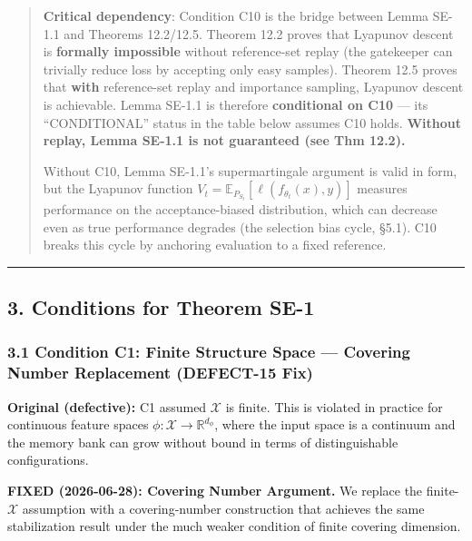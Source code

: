\documentclass[
  12pt,
]{article}
\begin{document}
\begin{quote}
\textbf{Critical dependency}: Condition C10 is the bridge between Lemma
SE-1.1 and Theorems 12.2/12.5. Theorem 12.2 proves that Lyapunov descent
is \textbf{formally impossible} without reference-set replay (the
gatekeeper can trivially reduce loss by accepting only easy samples).
Theorem 12.5 proves that \textbf{with} reference-set replay and
importance sampling, Lyapunov descent is achievable. Lemma SE-1.1 is
therefore \textbf{conditional on C10} --- its ``CONDITIONAL'' status in
the table below assumes C10 holds. \textbf{Without replay, Lemma SE-1.1
is not guaranteed (see Thm 12.2).}

Without C10, Lemma SE-1.1's supermartingale argument is valid in form,
but the Lyapunov function
\(V_t = \mathbb{E}_{P_{S_t}}[\ell(f_{\theta_t}(x), y)]\) measures
performance on the acceptance-biased distribution, which can decrease
even as true performance degrades (the selection bias cycle, §5.1). C10
breaks this cycle by anchoring evaluation to a fixed reference.
\end{quote}

\begin{center}\rule{0.5\linewidth}{0.5pt}\end{center}

\subsection{3. Conditions for Theorem
SE-1}\label{conditions-for-theorem-se-1}

\subsubsection{3.1 Condition C1: Finite Structure Space --- Covering
Number Replacement (DEFECT-15
Fix)}\label{condition-c1-finite-structure-space-covering-number-replacement-defect-15-fix}

\textbf{Original (defective):} C1 assumed \(\mathcal{X}\) is finite.
This is violated in practice for continuous feature spaces
\(\phi: \mathcal{X} \to \mathbb{R}^{d_\phi}\), where the input space is
a continuum and the memory bank can grow without bound in terms of
distinguishable configurations.

\textbf{FIXED (2026-06-28): Covering Number Argument.} We replace the
finite-\(\mathcal{X}\) assumption with a covering-number construction
that achieves the same stabilization result under the much weaker
condition of finite covering dimension.
\end{document}
